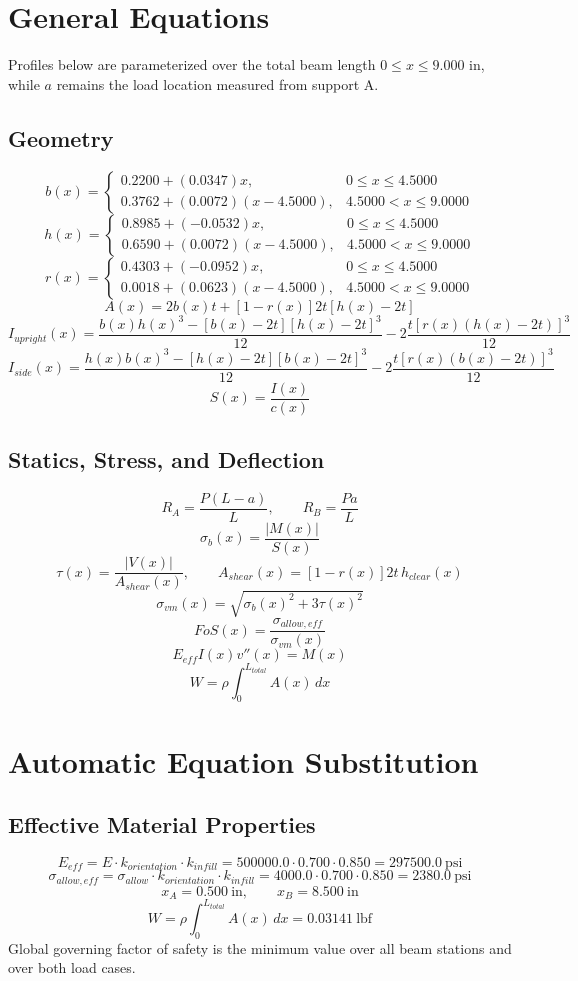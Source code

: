 \documentclass[11pt]{article}
\begin{document}
\section*{General Equations}
Profiles below are parameterized over the total beam length $0 \le x \le 9.000$ in, while $a$ remains the load location measured from support A.
\subsection*{Geometry}
\[
b(x)=\begin{cases}0.2200 + (0.0347)x, & 0 \le x \le 4.5000\\0.3762 + (0.0072)(x-4.5000), & 4.5000 < x \le 9.0000\end{cases}
\]
\[
h(x)=\begin{cases}0.8985 + (-0.0532)x, & 0 \le x \le 4.5000\\0.6590 + (0.0072)(x-4.5000), & 4.5000 < x \le 9.0000\end{cases}
\]
\[
r(x)=\begin{cases}0.4303 + (-0.0952)x, & 0 \le x \le 4.5000\\0.0018 + (0.0623)(x-4.5000), & 4.5000 < x \le 9.0000\end{cases}
\]
\[
A(x)=2b(x)t+[1-r(x)]2t[h(x)-2t]
\]
\[
I_{upright}(x)=\frac{b(x)h(x)^3-[b(x)-2t][h(x)-2t]^3}{12}-2\frac{t[r(x)(h(x)-2t)]^3}{12}
\]
\[
I_{side}(x)=\frac{h(x)b(x)^3-[h(x)-2t][b(x)-2t]^3}{12}-2\frac{t[r(x)(b(x)-2t)]^3}{12}
\]
\[
S(x)=\frac{I(x)}{c(x)}
\]

\subsection*{Statics, Stress, and Deflection}
\[
R_A=\frac{P(L-a)}{L}, \qquad R_B=\frac{Pa}{L}
\]
\[
\sigma_b(x)=\frac{|M(x)|}{S(x)}
\]
\[
\tau(x)=\frac{|V(x)|}{A_{shear}(x)}, \qquad A_{shear}(x)=[1-r(x)]2t\,h_{clear}(x)
\]
\[
\sigma_{vm}(x)=\sqrt{\sigma_b(x)^2+3\tau(x)^2}
\]
\[
FoS(x)=\frac{\sigma_{allow,eff}}{\sigma_{vm}(x)}
\]
\[
E_{eff}I(x)v''(x)=M(x)
\]
\[
W=\rho\int_0^{L_{total}} A(x)\,dx
\]

\section*{Automatic Equation Substitution}
\subsection*{Effective Material Properties}
\[E_{eff} = E \cdot k_{orientation} \cdot k_{infill} = 500000.0 \cdot 0.700 \cdot 0.850 = 297500.0\ \mathrm{psi}\]
\[\sigma_{allow,eff} = \sigma_{allow} \cdot k_{orientation} \cdot k_{infill} = 4000.0 \cdot 0.700 \cdot 0.850 = 2380.0\ \mathrm{psi}\]
\[x_A = 0.500\ \mathrm{in}, \qquad x_B = 8.500\ \mathrm{in}\]
\[W = \rho \int_0^{L_{total}} A(x)\,dx = 0.03141\ \mathrm{lbf}\]
Global governing factor of safety is the minimum value over all beam stations and over both load cases.
\end{document}
